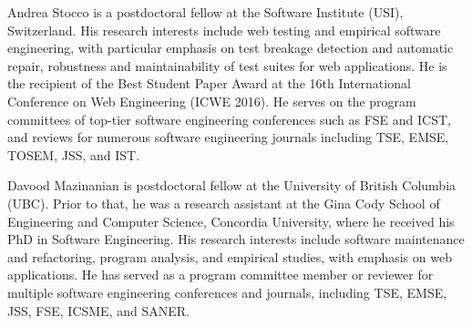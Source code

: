 \documentclass[10pt,journal,compsoc]{IEEEtran}
\begin{document}
\begin{IEEEbiography}{Andrea Stocco}
is a postdoctoral fellow at the Software Institute (USI), Switzerland. 
His research interests include web testing and empirical software engineering, with particular emphasis on test breakage detection and automatic repair, robustness and maintainability of test suites for web applications. He is the recipient of the Best Student Paper Award at the 16th International Conference on Web Engineering (ICWE 2016). 
He serves on the program committees of top-tier software engineering conferences such as FSE and ICST, and reviews for numerous software engineering journals including TSE, EMSE, TOSEM, JSS, and IST. 
\end{IEEEbiography}

\begin{IEEEbiography}{Davood Mazinanian}
is postdoctoral fellow at the University of British Columbia (UBC). 
Prior to that, he was a research assistant at the 
Gina Cody School of Engineering and Computer Science, 
Concordia University, where he received his PhD in Software Engineering. 
His research interests include software maintenance and refactoring, 
program analysis, and empirical studies, with emphasis on web applications. 
He has served as a program committee member or reviewer 
for multiple software engineering conferences and journals, 
including TSE, EMSE, JSS, FSE, ICSME, and SANER.
\end{IEEEbiography}
\end{document}
